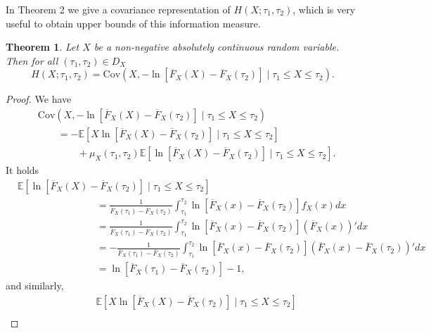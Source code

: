 \documentclass[11pt]{article}
\newtheorem{theorem}{Theorem}
\begin{document}
In Theorem 2 we give a covariance representation of $H(X;\tau_1,\tau_2)$, which is very useful to obtain upper bounds of this information measure.

 
\begin{theorem} Let $X$ be a non-negative absolutely continuous random variable. Then for all $(\tau_1,\tau_2) \in D_X$
	\begin{equation}
		\textstyle H(X;\tau_1,\tau_2) = \mathrm{Cov}\left(X, -\ln[\overline{F}_X(X)-\overline{F}_X(\tau_2)] \mid \tau_1 \leq X \leq \tau_2 \right).
	\end{equation}
\end{theorem}

\begin{proof} 
	We have
	\begin{align}
		&\mathrm{Cov}\left(X, -\ln[\overline{F}_X(X)-\overline{F}_X(\tau_2)] \mid \tau_1 \leq X \leq \tau_2 \right) \nonumber \\
		& \textstyle \qquad = -\mathbb{E}[X \ln[\overline{F}_X(X)-\overline{F}_X(\tau_2)] \mid \tau_1 \leq X \leq \tau_2] \nonumber \\
		& \textstyle \qquad \qquad + \mu_X(\tau_1,\tau_2) \mathbb{E}[\ln[\overline{F}_X(X)-\overline{F}_X(\tau_2)] \mid \tau_1 \leq X \leq \tau_2].
	\end{align}
	It holds
	\begin{align}
		& \mathbb{E}[\ln[\overline{F}_X(X)-\overline{F}_X(\tau_2)] \mid \tau_1 \leq X \leq \tau_2] \nonumber \\
		& \textstyle \qquad \qquad \qquad \qquad = \frac{1}{\overline{F}_X(\tau_1)-\overline{F}_X(\tau_2)} \int_{\tau_1}^{\tau_2} \ln[\overline{F}_X(x)-\overline{F}_X(\tau_2)] f_X(x) dx \nonumber \\
		& \textstyle \qquad \qquad \qquad \qquad = \frac{1}{\overline{F}_X(\tau_1)-\overline{F}_X(\tau_2)} \int_{\tau_1}^{\tau_2} \ln[\overline{F}_X(x)-\overline{F}_X(\tau_2)] (\overline{F}_X(x))' dx \nonumber \\
		& \textstyle \qquad \qquad \qquad \qquad = -\frac{1}{\overline{F}_X(\tau_1)-\overline{F}_X(\tau_2)} \int_{\tau_1}^{\tau_2} \ln[\overline{F}_X(x)-\overline{F}_X(\tau_2)] (\overline{F}_X(x)-\overline{F}_X(\tau_2))' dx \nonumber \\
		& \textstyle \qquad \qquad \qquad \qquad = \ln[\overline{F}_X(\tau_1)-\overline{F}_X(\tau_2)] - 1,
	\end{align}
	and similarly,
	\begin{align}
		& \qquad \mathbb{E}[X \ln[\overline{F}_X(X)-\overline{F}_X(\tau_2)] \mid \tau_1 \leq X \leq \tau_2] \nonumber \\

\end{align}
\end{proof}
\end{document}
